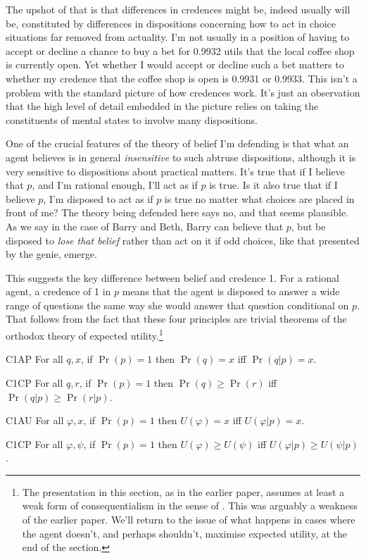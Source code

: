 \documentclass[11pt,oneside]{book}
\begin{document}
The upshot of that is that differences in credences might be, indeed usually will be, constituted by differences in dispositions concerning how to act in choice situations far removed from actuality. I'm not usually in a position of having to accept or decline a chance to buy a bet for 0.9932 utils that the local coffee shop is currently open. Yet whether I would accept or decline such a bet matters to whether my credence that the coffee shop is open is 0.9931 or 0.9933. This isn't a problem with the standard picture of how credences work. It's just an observation that the high level of detail embedded in the picture relies on taking the constituents of mental states to involve many dispositions.

One of the crucial features of the theory of belief I'm defending is that what an agent believes is in general \textit{insensitive} to such abtruse dispositions, although it is very sensitive to dispositions about practical matters. It's true that if I believe that $p$, and I'm rational enough, I'll act as if $p$ is true. Is it also true that if I believe $p$, I'm disposed to act as if $p$ is true no matter what choices are placed in front of me? The theory being defended here says no, and that seems plausible. As we say in the case of Barry and Beth, Barry can believe that $p$, but be disposed to \textit{lose that belief} rather than act on it if odd choices, like that presented by the genie, emerge.

This suggests the key difference between belief and credence 1. For a rational agent, a credence of 1 in $p$ means that the agent is disposed to answer a wide range of questions the same way she would answer that question conditional on $p$. That follows from the fact that these four principles are trivial theorems of the orthodox theory of expected utility.\footnote{The presentation in this section, as in the earlier paper, assumes at least a weak form of consequentialism in the sense of \cite{Hammond1988}. This was arguably a weakness of the earlier paper. We'll return to the issue of what happens in cases where the agent doesn't, and perhaps shouldn't, maximise expected utility, at the end of the section.} 

\begin{description*}
\item[C1AP] For all $q, x$, if $\Pr(p) = 1$ then $\Pr(q) = x$ iff $\Pr(q | p) = x$.
\item[C1CP] For all $q, r$, if $\Pr(p) = 1$ then $\Pr(q) \geq \Pr(r)$ iff $\Pr(q | p) \geq \Pr(r | p)$.
\item[C1AU] For all $\varphi, x$, if $\Pr(p) = 1$ then $U(\varphi) = x$ iff $U(\varphi | p) = x$.
\item[C1CP] For all $\varphi, \psi$, if $\Pr(p) = 1$ then $U(\varphi) \geq U(\psi)$ iff $U(\varphi | p) \geq U(\psi | p)$.
\end{description*}
\end{document}
